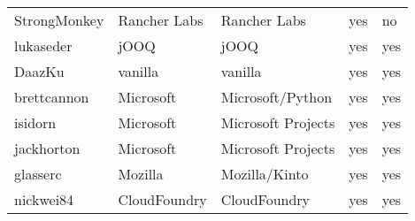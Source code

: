 \begin{landscape}
\begin{table}[]
\begin{tabular}{lllll}
            StrongMonkey  & Rancher Labs & Rancher Labs                 & yes          & no                     \\
            lukaseder     & jOOQ         & jOOQ                         & yes          & yes                    \\
            DaazKu        & vanilla      & vanilla                      & yes          & yes                    \\
            brettcannon   & Microsoft    & Microsoft/Python             & yes          & yes                    \\
            isidorn       & Microsoft    & Microsoft Projects           & yes          & yes                    \\
            jackhorton    & Microsoft    & Microsoft Projects           & yes          & yes                    \\
            glasserc      & Mozilla      & Mozilla/Kinto                & yes          & yes                    \\
            nickwei84     & CloudFoundry & CloudFoundry                 & yes          & yes                    \\
            \bottomrule
        \end{tabular}
    \end{table}
\end{landscape}
